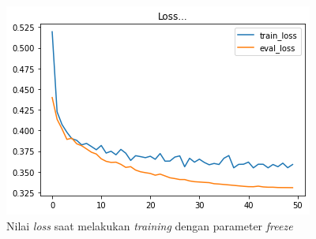 \begin{figure}[h]
    \begin{center}
        \includegraphics[width= 0.9\linewidth]{gambar/loss_freeze_50.png}
        \caption{Nilai \textit{loss} saat melakukan \textit{training} dengan parameter \textit{freeze}}
        \label{fig: loss_freeze}
    \end{center}
\end{figure}

